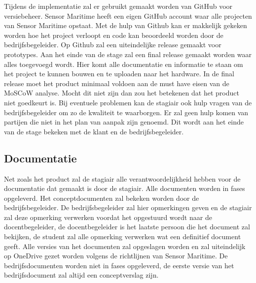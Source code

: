 \noindent Tijdens de implementatie zal er gebruikt gemaakt worden van GitHub voor versiebeheer. Sensor Maritime heeft een eigen GitHub account waar alle projecten van Sensor Maritime opstaat. Met de hulp van Github kan er makkelijk gekeken worden hoe het project verloopt en code kan beoordeeld worden door de bedrijfsbegeleider. Op Github zal een uiteindelijke release gemaakt voor prototypes. Aan het einde van de stage zal een final release gemaakt worden waar alles toegevoegd wordt. Hier komt alle documentatie en informatie te staan om het project te kunnen bouwen en te uploaden naar het hardware. In de final release moet het product minimaal voldoen aan de must have eisen van de MoSCoW analyse. Mocht dit niet zijn dan zou het betekenen dat het product niet goedkeurt is. Bij eventuele problemen kan de stagiair ook hulp vragen van de bedrijfsbegeleider om zo de kwaliteit te waarborgen. Er zal geen hulp komen van partijen die niet in het plan van aanpak zijn genoemd. Dit wordt aan het einde van de stage bekeken met de klant en de bedrijfsbegeleider.

\subsection{Documentatie}
Net zoals het product zal de stagiair alle verantwoordelijkheid hebben voor de documentatie dat gemaakt is door de stagiair. Alle documenten worden in fases opgeleverd. Het conceptdocumenten zal bekeken worden door de bedrijfsbegeleider. De bedrijfsbegeleider zal hier opmerkingen geven en de stagiair zal deze opmerking verwerken voordat het opgestuurd wordt naar de docentbegeleider, de docentbegeleider is het laatste persoon die het document zal bekijken, de student zal alle opmerking verwerken wat een definitief document geeft. Alle versies van het documenten zal opgeslagen worden en zal uiteindelijk op OneDrive gezet worden volgens de richtlijnen van Sensor Maritime. De bedrijfsdocumenten worden niet in fases opgeleverd, de eerste versie van het bedrijfsdocument zal altijd een conceptverslag zijn.